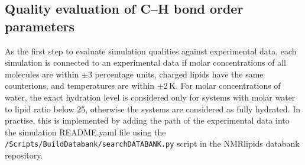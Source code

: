 \documentclass[fleqn,10pt]{wlscirep}
\begin{document}
\subsection{Quality evaluation of C--H bond order parameters}
As the first step to evaluate simulation qualities against experimental data, each simulation is connected to an experimental data if molar concentrations of all molecules are within $\pm$3 percentage units, charged lipids have the same counterions, and temperatures are within $\pm$2\,K. For molar concentrations of water, the exact hydration level is considered only for systems with molar water to lipid ratio below 25, otherwise the systems are considered as fully hydrated. In practise, this is implemented by adding the path of the experimental data into the simulation README.yaml file using the \texttt{/Scripts/BuildDatabank/searchDATABANK.py} script in the NMRlipids databank repository. 
\end{document}
